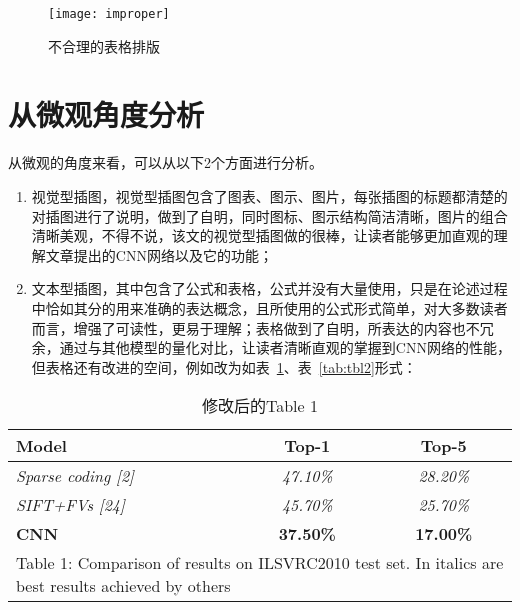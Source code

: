 \begin{figure}[!htbp]
	\centering
	\texttt{[image: improper]}
	\caption{不合理的表格排版}
	\label{fig:improper}
\end{figure}

\section{从微观角度分析}
从微观的角度来看，可以从以下2个方面进行分析。
\begin{enumerate}
\item 视觉型插图，视觉型插图包含了图表、图示、图片，每张插图的标题都清楚的对插图进行了说明，做到了自明，同时图标、图示结构简洁清晰，图片的组合清晰美观，不得不说，该文的视觉型插图做的很棒，让读者能够更加直观的理解文章提出的CNN网络以及它的功能；
\item 文本型插图，其中包含了公式和表格，公式并没有大量使用，只是在论述过程中恰如其分的用来准确的表达概念，且所使用的公式形式简单，对大多数读者而言，增强了可读性，更易于理解；表格做到了自明，所表达的内容也不冗余，通过与其他模型的量化对比，让读者清晰直观的掌握到CNN网络的性能，但表格还有改进的空间，例如改为如表~\ref{tab:tbl1}、表~\ref{tab:tbl2}形式：

\end{enumerate}
\begin{table}[!htbp]
  \renewcommand\arraystretch{0.8}
  \centering
  \caption{修改后的Table 1}
    \begin{tabular}{p{10.915em}rr}
    \toprule
    \textbf{Model} & \multicolumn{1}{c}{\textbf{Top-1}} & \multicolumn{1}{c}{\textbf{Top-5}} \\
    \midrule
    \textit{Sparse coding [2]} & \multicolumn{1}{c}{\textit{47.10\%}} & \multicolumn{1}{c}{\textit{28.20\%}} \\
    \textit{SIFT+FVs [24]} & \multicolumn{1}{c}{\textit{45.70\%}} & \multicolumn{1}{c}{\textit{25.70\%}} \\
    \textbf{CNN} & \multicolumn{1}{c}{\textbf{37.50\%}} & \multicolumn{1}{c}{\textbf{17.00\%}} \\
    \midrule
    \multicolumn{3}{p{22.415em}}{Table 1: Comparison of results on ILSVRC2010 test set. In italics are best results achieved by others} \\
    \end{tabular}%
  \label{tab:tbl1}%
\end{table}%

